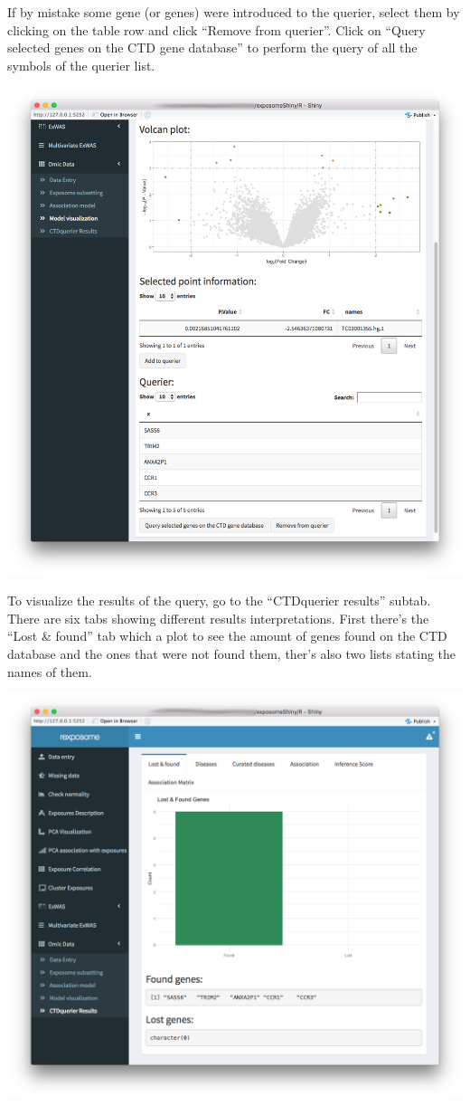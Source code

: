 \documentclass[
]{book}
\begin{document}
If by mistake some gene (or genes) were introduced to the querier, select them by clicking on the table row and click ``Remove from querier''. Click on ``Query selected genes on the CTD gene database'' to perform the query of all the symbols of the querier list.

\includegraphics{images/analysis10_3.png}

To visualize the results of the query, go to the ``CTDquerier results'' subtab. There are six tabs showing different results interpretations. First there's the ``Lost \& found'' tab which a plot to see the amount of genes found on the CTD database and the ones that were not found them, ther's also two lists stating the names of them.

\includegraphics{images/analysis10_4.png}
\end{document}
